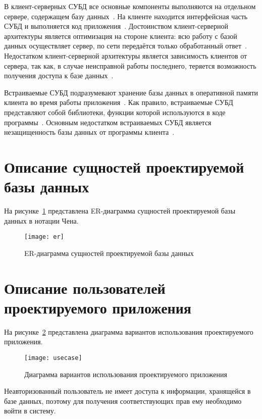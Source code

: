 В клиент-серверных СУБД все основные компоненты выполняются на отдельном сервере, содержащем базу данных~\cite{dbmsu}.
На клиенте находится интерфейсная часть СУБД и выполняется код приложения~\cite{dbmsu}.
Достоинством клиент-серверной архитектуры является оптимизация на стороне клиента: всю работу с базой данных осуществляет сервер, по сети передаётся только обработанный ответ~\cite{dbmsu}.
Недостатком клиент-серверной архитектуры является зависимость клиентов от сервера, так как, в случае неисправной работы последнего, теряется возможность получения доступа к базе данных~\cite{dbmsu}.

Встраиваемые СУБД подразумевают хранение базы данных в оперативной памяти клиента во время работы приложения~\cite{dbmsu}.
Как правило, встраиваемые СУБД представляют собой библиотеки, функции которой используются в коде программы~\cite{dbmsu}.
Основным недостатком встраиваемых СУБД является незащищенность базы данных от программы клиента~\cite{dbmsu}.

\section[Описание сущностей проектируемой базы данных]{Описание сущностей проектируемой\\базы данных}

На рисунке~\ref{er} представлена ER-диаграмма сущностей проектируемой базы данных в нотации Чена.
\begin{figure}[H]
	\centering
	\texttt{[image: er]}
	\caption{ER-диаграмма сущностей проектируемой базы данных}
	\label{er}
\end{figure}

\section[Описание пользователей проектируемого приложения]{Описание пользователей\\проектируемого приложения}

На рисунке~\ref{usecase} представлена диаграмма вариантов использования проектируемого приложения.
\begin{figure}[H]
	\centering
	\texttt{[image: usecase]}
	\caption{Диаграмма вариантов использования проектируемого приложения}
	\label{usecase}
\end{figure}

Неавторизованный пользователь не имеет доступа к информации, хранящейся в базе данных, поэтому для получения соответствующих прав ему необходимо войти в систему.


